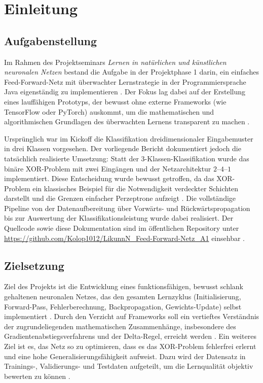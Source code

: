 \section{Einleitung}
\label{sec:einleitung}


\subsection{Aufgabenstellung}
Im Rahmen des Projektseminars \emph{Lernen in natürlichen und künstlichen neuronalen Netzen} bestand die Aufgabe in der Projektphase 1 darin, ein einfaches Feed-Forward-Netz mit überwachter Lernstrategie in der Programmiersprache Java eigenständig zu implementieren \cite{vieten_sw01}. Der Fokus lag dabei auf der Erstellung eines lauffähigen Prototyps, der bewusst ohne externe Frameworks (wie TensorFlow oder PyTorch) auskommt, um die mathematischen und algorithmischen Grundlagen des überwachten Lernens transparent zu machen \cite{goodfellow2016}.

Ursprünglich war im Kickoff die Klassifikation dreidimensionaler Eingabemuster in drei Klassen vorgesehen. Der vorliegende Bericht dokumentiert jedoch die tatsächlich realisierte Umsetzung: Statt der 3-Klassen-Klassifikation wurde das binäre XOR-Problem mit zwei Eingängen und der Netzarchitektur \(2\text{--}4\text{--}1\) implementiert. Diese Entscheidung wurde bewusst getroffen, da das XOR-Problem ein klassisches Beispiel für die Notwendigkeit verdeckter Schichten darstellt und die Grenzen einfacher Perzeptrone aufzeigt \cite{minsky1969perceptrons}. Die vollständige Pipeline von der Datenaufbereitung über Vorwärts- und Rückwärtspropagation bis zur Auswertung der Klassifikationsleistung wurde dabei realisiert. Der Quellcode sowie diese Dokumentation sind im öffentlichen Repository unter \url{https://github.com/Kolop1012/LikunnN_Feed-Forward-Netz_A1} einsehbar \cite{github_repo}.

\subsection{Zielsetzung}
Ziel des Projekts ist die Entwicklung eines funktionsfähigen, bewusst schlank gehaltenen neuronalen Netzes, das den gesamten Lernzyklus (Initialisierung, Forward-Pass, Fehlerberechnung, Backpropagation, Gewichts-Update) selbst implementiert \cite{vieten_sw03}. Durch den Verzicht auf Frameworks soll ein vertieftes Verständnis der zugrundeliegenden mathematischen Zusammenhänge, insbesondere des Gradientenabstiegsverfahrens und der Delta-Regel, erreicht werden \cite{rumelhart1986}. Ein weiteres Ziel ist es, das Netz so zu optimieren, dass es das XOR-Problem fehlerfrei erlernt und eine hohe Generalisierungsfähigkeit aufweist. Dazu wird der Datensatz in Trainings-, Validierungs- und Testdaten aufgeteilt, um die Lernqualität objektiv bewerten zu können \cite{nielsen2015}.

